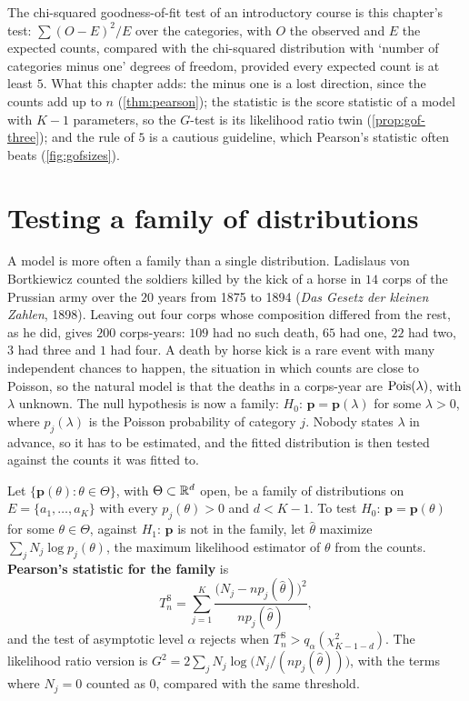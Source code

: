 \begin{bridge}
The chi-squared goodness-of-fit test of an introductory course is this chapter's test: $\sum (O - E)^2/E$ over the categories, with $O$ the observed and $E$ the expected counts, compared with the chi-squared distribution with `number of categories minus one' degrees of freedom, provided every expected count is at least $5$.
What this chapter adds: the minus one is a lost direction, since the counts add up to $n$ (\cref{thm:pearson}); the statistic is the score statistic of a model with $K - 1$ parameters, so the $G$-test is its likelihood ratio twin (\cref{prop:gof-three}); and the rule of $5$ is a cautious guideline, which Pearson's statistic often beats (\cref{fig:gofsizes}).
\end{bridge}

\section{Testing a family of distributions}
\label{sec:gof-family}

A model is more often a family than a single distribution.
Ladislaus von Bortkiewicz counted the soldiers killed by the kick of a horse in $14$ corps of the Prussian army over the $20$ years from 1875 to 1894 (\textit{Das Gesetz der kleinen Zahlen}, 1898).
Leaving out four corps whose composition differed from the rest, as he did, gives $200$ corps-years: $109$ had no such death, $65$ had one, $22$ had two, $3$ had three and $1$ had four.
A death by horse kick is a rare event with many independent chances to happen, the situation in which counts are close to Poisson, so the natural model is that the deaths in a corps-year are $\text{Pois}(\lambda)$, with $\lambda$ unknown.
The null hypothesis is now a family: $H_0$: $\mathbf{p} = \mathbf{p}(\lambda)$ for some $\lambda > 0$, where $p_j(\lambda)$ is the Poisson probability of category $j$.
Nobody states $\lambda$ in advance, so it has to be estimated, and the fitted distribution is then tested against the counts it was fitted to.

\begin{definition}
\label{def:gof-family}
Let $\{\mathbf{p}(\theta) : \theta \in \Theta\}$, with $\Theta \subset \mathbb{R}^d$ open, be a family of distributions on $E = \{a_1, \ldots, a_K\}$ with every $p_j(\theta) > 0$ and $d < K - 1$.
To test $H_0$: $\mathbf{p} = \mathbf{p}(\theta)$ for some $\theta \in \Theta$, against $H_1$: $\mathbf{p}$ is not in the family, let $\hat{\theta}$ maximize $\sum_j N_j\log p_j(\theta)$, the maximum likelihood estimator of $\theta$ from the counts.
\textbf{Pearson's statistic for the family} is
\[
T^{\mathrm{S}}_n = \sum_{j=1}^K\frac{\big(N_j - np_j(\hat{\theta})\big)^2}{np_j(\hat{\theta})},
\]
and the test of asymptotic level $\alpha$ rejects when $T^{\mathrm{S}}_n > q_\alpha(\chi^2_{K-1-d})$.
The likelihood ratio version is $G^2 = 2\sum_j N_j\log\big(N_j/(np_j(\hat{\theta}))\big)$, with the terms where $N_j = 0$ counted as $0$, compared with the same threshold.
\end{definition}

